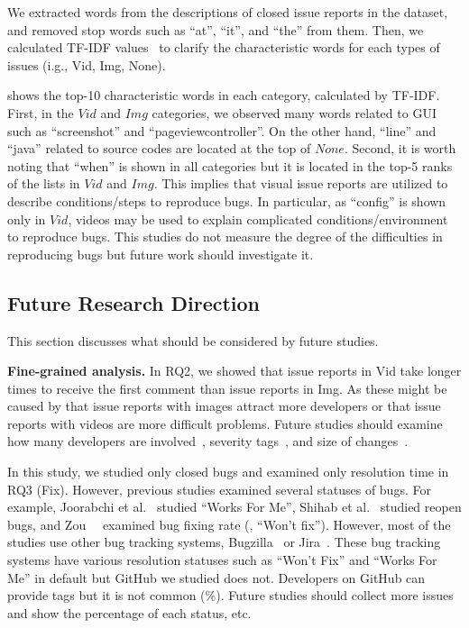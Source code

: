 We extracted words from the descriptions of closed issue reports in the dataset, and  removed stop words such as ``at'', ``it'', and ``the'' from them. 
Then, we calculated TF-IDF values~\citep{salton1988-tfidf} to clarify the characteristic words for each types of issues (i.g., Vid, Img, None). 

 shows the top-10 characteristic words in each category, calculated by TF-IDF.
First, in the $Vid$ and $Img$ categories, we observed many words related to GUI such as ``screenshot'' and ``pageviewcontroller''. 
On the other hand, ``line'' and ``java'' related to source codes are located at the top of $None$.
Second, it is worth noting that ``when'' is shown in all categories but it is located in the top-5 ranks of the lists in $Vid$ and $Img$.
This implies that visual issue reports are utilized to describe conditions/steps to reproduce bugs. In particular, as ``config'' is shown only in $Vid$, videos may be used to explain complicated conditions/environment to reproduce bugs. This studies do not measure the degree of the difficulties in reproducing bugs but future work should investigate it.



\subsection{Future Research Direction}
This section discusses what should be considered by future studies. 

\noindent
\textbf{Fine-grained analysis. }
In RQ2, we showed that issue reports in Vid take longer times to receive the first comment than issue reports in Img. 
As these might be caused by that issue reports with images attract more developers or that issue reports with videos are more difficult problems.
Future studies should examine how many developers are involved~\citep{DBLP:conf/icsm/BavotaR15}, severity tags~\citep{DBLP:conf/issre/ZhouNG15}, and size of changes~\citep{DBLP:conf/kbse/HattoriL08}.

In this study, we studied only closed bugs and examined only resolution time in RQ3 (Fix). However, previous studies examined several statuses of bugs. For example, Joorabchi et al.~\citep{DBLP:conf/msr/JoorabchiMM14} studied ``Works For Me'', Shihab et al.~\citep{DBLP:journals/ese/ShihabIKIOAHM13} studied reopen bugs, and Zou~\et~\citep{DBLP:conf/compsac/ZouXZCL15} examined bug fixing rate (\eg, ``Won't fix''). However, most of the studies use other bug tracking systems, Bugzilla~\citep{Bugzilla} or Jira~\citep{JIRA}. These bug tracking systems have various resolution statuses such as ``Won't Fix'' and ``Works For Me''  in default but GitHub we studied does not. Developers on GitHub can provide tags but it is not common (\%). Future studies should collect more issues and show the percentage of each status, etc. 

